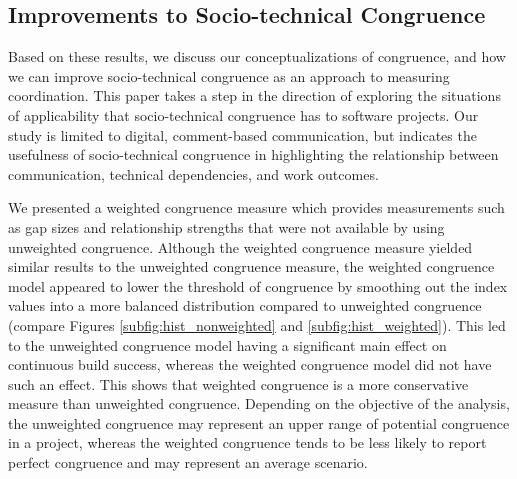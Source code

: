 
\subsection{Improvements to Socio-technical Congruence}
\label{sec:improvements}

Based on these results, we discuss our conceptualizations of congruence, and how we can improve socio-technical congruence as an approach to measuring coordination. This paper takes a step in the direction of exploring the situations of applicability that socio-technical congruence has to software projects. Our study is limited to digital, comment-based communication, but indicates the usefulness of socio-technical congruence in highlighting the relationship between communication, technical dependencies, and work outcomes.


We presented a weighted congruence measure which provides measurements such as gap sizes and relationship strengths that were not available by using unweighted congruence. Although the weighted congruence measure yielded similar results to the unweighted congruence measure, the weighted congruence model appeared to lower the threshold of congruence by smoothing out the index values into a more balanced distribution compared to unweighted congruence (compare Figures \ref{subfig:hist_nonweighted} and \ref{subfig:hist_weighted}).
This led to the unweighted congruence model having a significant main effect on continuous build success, whereas the weighted congruence model did not have such an effect.
This shows that weighted congruence is a more conservative
measure than unweighted congruence. Depending on the objective of the
analysis, the unweighted congruence may represent an upper range of
potential congruence in a project, whereas the weighted congruence
tends to be less likely to report perfect congruence and may represent an average scenario.

